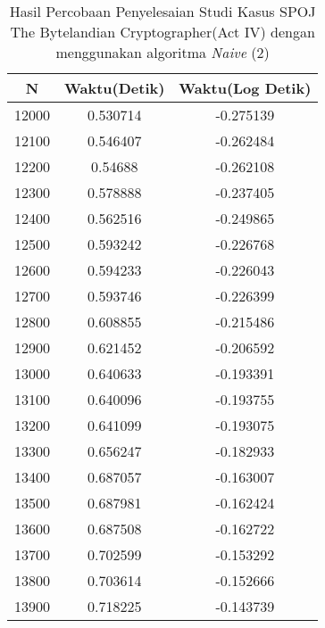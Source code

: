 \begin{table}[H]
\centering
\caption {Hasil Percobaan Penyelesaian Studi Kasus SPOJ The Bytelandian Cryptographer(Act IV) dengan menggunakan algoritma \textit{Naive} (2)}
\begin{tabular}{|c|c|c|}\hline
N&Waktu(Detik)&Waktu(Log Detik)\\ \hline
12000&0.530714&-0.275139\\ \hline
12100&0.546407&-0.262484\\ \hline
12200&0.54688&-0.262108\\ \hline
12300&0.578888&-0.237405\\ \hline
12400&0.562516&-0.249865\\ \hline
12500&0.593242&-0.226768\\ \hline
12600&0.594233&-0.226043\\ \hline
12700&0.593746&-0.226399\\ \hline
12800&0.608855&-0.215486\\ \hline
12900&0.621452&-0.206592\\ \hline
13000&0.640633&-0.193391\\ \hline
13100&0.640096&-0.193755\\ \hline
13200&0.641099&-0.193075\\ \hline
13300&0.656247&-0.182933\\ \hline
13400&0.687057&-0.163007\\ \hline
13500&0.687981&-0.162424\\ \hline
13600&0.687508&-0.162722\\ \hline
13700&0.702599&-0.153292\\ \hline
13800&0.703614&-0.152666\\ \hline
13900&0.718225&-0.143739\\ \hline
\end{tabular}
\label{tab:res4}
\end{table}
